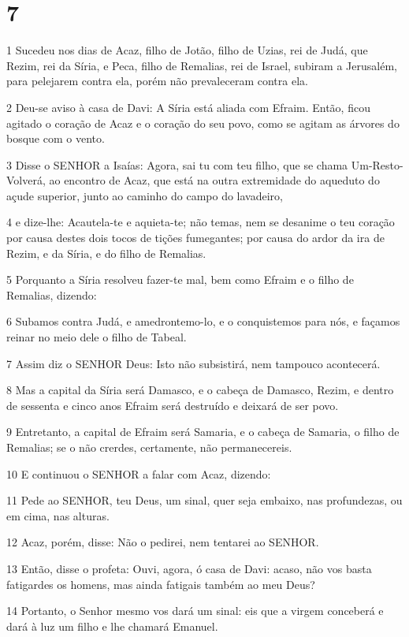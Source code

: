 \chapter{7}

\par 1 Sucedeu nos dias de Acaz, filho de Jotão, filho de Uzias, rei de Judá, que Rezim, rei da Síria, e Peca, filho de Remalias, rei de Israel, subiram a Jerusalém, para pelejarem contra ela, porém não prevaleceram contra ela.
\par 2 Deu-se aviso à casa de Davi: A Síria está aliada com Efraim. Então, ficou agitado o coração de Acaz e o coração do seu povo, como se agitam as árvores do bosque com o vento.
\par 3 Disse o SENHOR a Isaías: Agora, sai tu com teu filho, que se chama Um-Resto-Volverá, ao encontro de Acaz, que está na outra extremidade do aqueduto do açude superior, junto ao caminho do campo do lavadeiro,
\par 4 e dize-lhe: Acautela-te e aquieta-te; não temas, nem se desanime o teu coração por causa destes dois tocos de tições fumegantes; por causa do ardor da ira de Rezim, e da Síria, e do filho de Remalias.
\par 5 Porquanto a Síria resolveu fazer-te mal, bem como Efraim e o filho de Remalias, dizendo:
\par 6 Subamos contra Judá, e amedrontemo-lo, e o conquistemos para nós, e façamos reinar no meio dele o filho de Tabeal.
\par 7 Assim diz o SENHOR Deus: Isto não subsistirá, nem tampouco acontecerá.
\par 8 Mas a capital da Síria será Damasco, e o cabeça de Damasco, Rezim, e dentro de sessenta e cinco anos Efraim será destruído e deixará de ser povo.
\par 9 Entretanto, a capital de Efraim será Samaria, e o cabeça de Samaria, o filho de Remalias; se o não crerdes, certamente, não permanecereis.
\par 10 E continuou o SENHOR a falar com Acaz, dizendo:
\par 11 Pede ao SENHOR, teu Deus, um sinal, quer seja embaixo, nas profundezas, ou em cima, nas alturas.
\par 12 Acaz, porém, disse: Não o pedirei, nem tentarei ao SENHOR.
\par 13 Então, disse o profeta: Ouvi, agora, ó casa de Davi: acaso, não vos basta fatigardes os homens, mas ainda fatigais também ao meu Deus?
\par 14 Portanto, o Senhor mesmo vos dará um sinal: eis que a virgem conceberá e dará à luz um filho e lhe chamará Emanuel.
